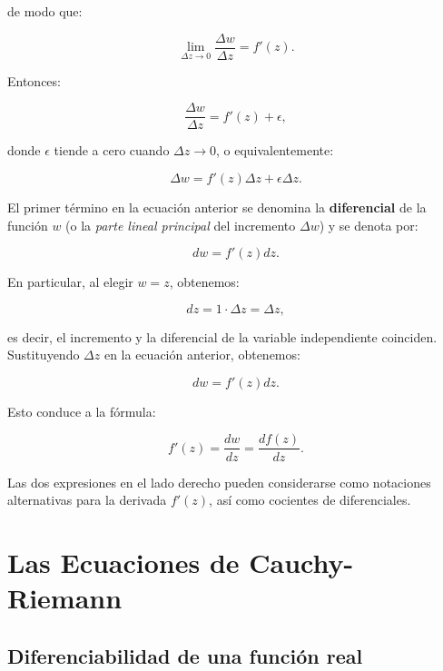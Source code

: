 \documentclass[10pt,a4paper]{book}
\begin{document}
de modo que:

\begin{equation}
    \lim_{\Delta z \to 0} \frac{\Delta w}{\Delta z} = f'(z).
\end{equation}

Entonces:

\begin{equation}
    \frac{\Delta w}{\Delta z} = f'(z) + \epsilon,
\end{equation}

donde $ \epsilon $ tiende a cero cuando $ \Delta z \to 0 $, o equivalentemente:

\begin{equation}
    \Delta w = f'(z) \Delta z + \epsilon \Delta z.
\end{equation}

El primer t\'ermino en la ecuaci\'on anterior se denomina la \textbf{diferencial} de la funci\'on $ w $ (o la \textit{parte lineal principal} del incremento $ \Delta w $) y se denota por:

\begin{equation}
    dw = f'(z) dz.
\end{equation}

En particular, al elegir $ w = z $, obtenemos:

\begin{equation}
    dz = 1 \cdot \Delta z = \Delta z,
\end{equation}

es decir, el incremento y la diferencial de la variable independiente coinciden. Sustituyendo $ \Delta z $ en la ecuaci\'on anterior, obtenemos:

\begin{equation}
    dw = f'(z) dz.
\end{equation}

Esto conduce a la f\'ormula:

\begin{equation}
    f'(z) = \frac{dw}{dz} = \frac{df(z)}{dz}.
\end{equation}

Las dos expresiones en el lado derecho pueden considerarse como notaciones alternativas para la derivada $ f'(z) $, as\'i como cocientes de diferenciales.
\newpage
\section{Las Ecuaciones de Cauchy-Riemann}

\subsection{Diferenciabilidad de una funci\'on real}
\end{document}
